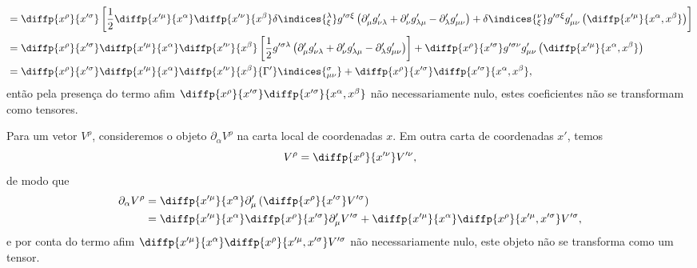 {\begin{align*}
                                           &= \diffp{x^\rho}{x'^\sigma}\left[\frac12 \diffp{x'^\mu}{x^\alpha} \diffp{x'^\nu}{x^\beta}\delta\indices{^\lambda_{\xi}} g'^{\sigma\xi}\left(\partial'_\mu g'_{\nu \lambda} + \partial'_\nu g'_{\lambda \mu} - \partial'_{\lambda}g'_{\mu \nu}\right) +\delta\indices{^\nu_\xi}g'^{\sigma\xi}g'_{\mu\nu}\left(\diffp{x'^\mu}{x^\alpha,x^\beta}\right)\right]\\
                                           &= \diffp{x^\rho}{x'^\sigma}\diffp{x'^\mu}{x^\alpha} \diffp{x'^\nu}{x^\beta}\left[\frac12g'^{\sigma\lambda}\left(\partial'_\mu g'_{\nu \lambda} + \partial'_\nu g'_{\lambda \mu} - \partial'_{\lambda}g'_{\mu \nu}\right)\right] +\diffp{x^\rho}{x'^\sigma}g'^{\sigma\nu}g'_{\mu\nu}\left(\diffp{x'^\mu}{x^\alpha,x^\beta}\right)\\
                                           &= \diffp{x^\rho}{x'^\sigma}\diffp{x'^\mu}{x^\alpha} \diffp{x'^\nu}{x^\beta}{\Gamma'}\indices{^\sigma_{\mu\nu}} + \diffp{x^\rho}{x'^\sigma}\diffp{x'^\sigma}{x^\alpha,x^\beta},
\end{align*}
então pela presença do termo afim \(\diffp{x^\rho}{x'^\sigma}\diffp{x'^\sigma}{x^\alpha,x^\beta}\) não necessariamente nulo, estes coeficientes não se transformam como tensores.

Para um vetor \(V^\rho\), consideremos o objeto \(\partial_{\alpha}V^\rho\) na carta local de coordenadas \(x\). Em outra carta de coordenadas \(x'\), temos
\begin{equation*}
 V^\rho = \diffp{x^\rho}{x'^\nu} V'^\nu,
\end{equation*}
de modo que
\begin{align*}
    \partial_{\alpha}V^\rho &= \diffp{x'^\mu}{x^\alpha} \partial'_{\mu}\left(\diffp{x^\rho}{x'^\sigma} V'^\sigma\right)\\
                             &= \diffp{x'^\mu}{x^\alpha} \diffp{x^\rho}{x'^\sigma} \partial'_\mu V'^\sigma + \diffp{x'^\mu}{x^\alpha} \diffp{x^\rho}{x'^\mu,x'^\sigma} V'^\sigma,
\end{align*}
e por conta do termo afim \(\diffp{x'^\mu}{x^\alpha} \diffp{x^\rho}{x'^\mu,x'^\sigma} V'^\sigma\) não necessariamente nulo, este objeto não se transforma como um tensor.

}
